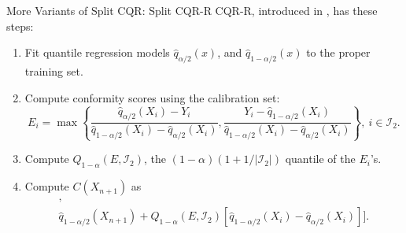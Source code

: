 \documentclass{beamer}
\begin{document}
\begin{frame}{More Variants of Split CQR: Split CQR-R}
    CQR-R, introduced in \cite{sesia2020comp}, has these steps:
    \begin{enumerate}
        \item Fit quantile regression models $\widehat{q}_{\alpha / 2}(x)$, and $\widehat{q}_{1 - \alpha / 2}(x)$ to the proper training set.
        \item Compute conformity scores using the calibration set:
        \[
        E_i = \max\left\{\frac{\widehat{q}_{\alpha / 2}(X_i) - Y_i}{\widehat{q}_{1 - \alpha / 2}(X_i) - \widehat{q}_{\alpha / 2}(X_i)}, \frac{Y_i - \widehat{q}_{1 - \alpha / 2}(X_i)}{\widehat{q}_{1 - \alpha / 2}(X_i) - \widehat{q}_{\alpha / 2}(X_i)}\right\}, \ i \in \mathcal{I}_2.
        \]
        \item Compute $Q_{1 - \alpha}(E, \mathcal{I}_2)$, the $(1 - \alpha)(1 + 1 / |\mathcal{I}_2|)$ quantile of the $E_i$'s.
        \item Compute $C(X_{n + 1})$ as
        \begin{multline*}
            [\widehat{q}_{\alpha / 2}(X_{n + 1}) - Q_{1 - \alpha}(E, \mathcal{I}_2)
               [\widehat{q}_{1 - \alpha / 2}(X_i) - \widehat{q}_{\alpha / 2}(X_i)], \\
            \widehat{q}_{1 - \alpha / 2}(X_{n + 1}) + Q_{1 - \alpha}(E, \mathcal{I}_2)
               [\widehat{q}_{1 - \alpha / 2}(X_i) - \widehat{q}_{\alpha / 2}(X_i)]].
        \end{multline*}
    \end{enumerate}
\end{frame}
\end{document}
